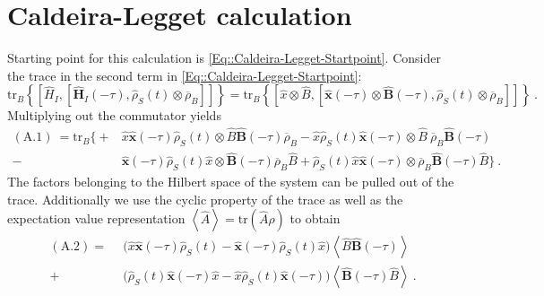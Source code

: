 	\section{Caldeira-Legget calculation} \label{Section::Appendix-Caldeira-Legget}
	Starting point for this calculation is \autoref{Eq::Caldeira-Legget-Startpoint}. Consider the trace in the second term in \autoref{Eq::Caldeira-Legget-Startpoint}:
	\begin{equation}
		\text{tr}_B \left\{  \left[{\hat{H}}_I, \left[{\boldsymbol{\hat{H}}}_I(- \tau), {\hat{\rho}}_S(t) \otimes \overline{\rho}_B \right]\right]  \right\} =	\text{tr}_B \left\{  \left[\hat{x} \otimes \hat{B}, \left[{\boldsymbol{\hat{x}}}(- \tau) \otimes \boldsymbol{\hat{B}}(- \tau), {\hat{\rho}}_S(t) \otimes \overline{\rho}_B \right]\right]  \right\}~.
	\end{equation}
	Multiplying out the commutator yields
	\begin{equation} \label{Eq::Caldeira-Leggett-Trace}
		\begin{split}
			(\text{A.1})~=\text{tr}_B \bigg \{+&\hat{x} \boldsymbol{\hat{x}}(-\tau) \hat{\rho}_S(t) \otimes \hat{B} \boldsymbol{\hat{B}}(-\tau) \overline{\rho}_B 
			- \hat{x}  \hat{\rho}_S(t) \boldsymbol{\hat{x}}(-\tau) \otimes \hat{B}  ~\overline{\rho}_B \boldsymbol{\hat{B}}(-\tau)\\
			-&  \boldsymbol{\hat{x}}(-\tau) \hat{\rho}_S(t) \hat{x} \otimes  	\boldsymbol{\hat{B}}(-\tau) \overline{\rho}_B \hat{B}
			+ \hat{\rho}_S(t) \hat{x} \boldsymbol{\hat{x}}(-\tau)  \otimes \overline{\rho}_B \boldsymbol{\hat{B}}(-\tau) \hat{B}   \bigg \}~.
		\end{split}
	\end{equation}
	The factors belonging to the Hilbert space of the system can be pulled out of the trace. Additionally we use the cyclic property of the trace as well as the expectation value representation $\left \langle \hat{A} \right \rangle =	\text{tr}\left(\hat{A}\rho\right)$ to obtain
	\begin{equation}
		\begin{split}
			(\text{A}.2) =	~~  &\Big (\hat{x} \boldsymbol{\hat{x}}(-\tau) \hat{\rho}_S(t) - \boldsymbol{\hat{x}}(-\tau) \hat{\rho}_S(t) \hat{x}   \Big) \left \langle \hat{B} \boldsymbol{\hat{B}}(-\tau) \right \rangle \\
			+& \Big (  \hat{\rho}_S(t) \boldsymbol{\hat{x}}(-\tau) \hat{x}  - \hat{x} \hat{\rho}_S(t) \boldsymbol{\hat{x}}(-\tau)    \Big) \left \langle \boldsymbol{\hat{B}}(-\tau) \hat{B}  \right \rangle ~.
		\end{split}
	\end{equation}
